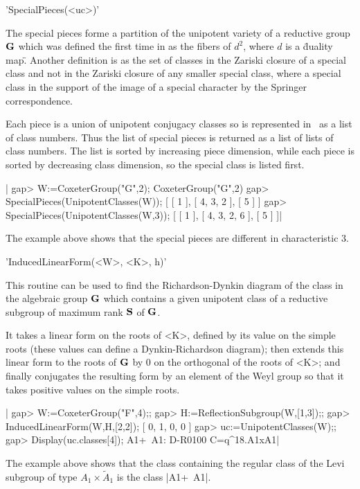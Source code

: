 
'SpecialPieces(<uc>)'

The  special  pieces  forme  a  partition  of  the  unipotent  variety of a
reductive  group  ${\bf G}$  which  was  defined  the first time in \cite[chap.
III]{spalt82}  as  the  fibers  of  $d^2$,  where $d$ is a \"duality map\".
Another  definition is as  the set of  classes in the  Zariski closure of a
special  class and not in the Zariski closure of any smaller special class,
where a special class in the support of the image of a special character by
the Springer correspondence.

Each  piece is a union of unipotent  conjugacy classes so is represented in
\CHEVIE\  as a list  of class numbers.  Thus the list  of special pieces is
returned  as  a  list  of  lists  of  class  numbers. The list is sorted by
increasing  piece dimension, while each piece is sorted by decreasing class
dimension, so the special class is listed first.

|    gap> W:=CoxeterGroup("G",2);
    CoxeterGroup("G",2)
    gap> SpecialPieces(UnipotentClasses(W));
    [ [ 1 ], [ 4, 3, 2 ], [ 5 ] ]
    gap> SpecialPieces(UnipotentClasses(W,3));
    [ [ 1 ], [ 4, 3, 2, 6 ], [ 5 ] ]|

The   example  above  shows  that  the  special  pieces  are  different  in
characteristic 3.


'InducedLinearForm(<W>, <K>, h)'

This routine can be used to find the Richardson-Dynkin diagram of the class
in  the algebraic group ${\bf G}$  which contains a given  unipotent class of a
reductive subgroup of maximum rank ${\bf S}$ of ${\bf G}$.

It  takes a linear  form on the  roots of <K>,  defined by its value on the
simple  roots (these values  can define a  Dynkin-Richardson diagram); then
extends  this linear form to the roots of ${\bf G}$ by $0$ on the orthogonal of
the  roots of <K>; and finally conjugates  the resulting form by an element
of the Weyl group so that it takes positive values on the simple roots.

|    gap> W:=CoxeterGroup("F",4);;
    gap> H:=ReflectionSubgroup(W,[1,3]);;
    gap> InducedLinearForm(W,H,[2,2]);
    [ 0, 1, 0, 0 ]
    gap> uc:=UnipotentClasses(W);;
    gap> Display(uc.classes[4]);
    A1+~A1: D-R0100 C=q^18.A1xA1|

The  example above shows that the class containing the regular class of the
Levi subgroup of type $A_1\times \tilde A_1$ is the class |A1+~A1|.

%
%
%
%
